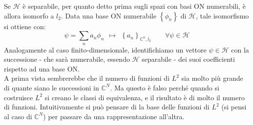 \documentclass[FisicaTeorica.tex]{subfiles}
\begin{document}
Se $\mathcal{H}$ è separabile, per quanto detto prima sugli spazi con basi ON numerabili, è allora isomorfo a $l_2$.  Data una base ON numerabile $\left\{\phi_n\right\}$ di $\mathcal{H}$, tale isomorfismo si ottiene con:
\[
\psi = \sum_{n}{a_n\phi_n} \ \ \mapsto \ \ \left\{a_n\right\}_{\mathbb{C}^n,l_2} \qquad \forall \psi \in \mathcal{H}
\]
Analogamente al caso finito-dimensionale, identifichiamo un vettore $\psi \in \mathcal{H}$ con la successione - che sarà numerabile, essendo $\mathcal{H}$ separabile - dei suoi coefficienti rispetto ad una base ON.\\

A prima vista sembrerebbe che il numero di funzioni di $L^2$ sia molto più grande di quante siano le successioni in ${\mathbb C^N}$. Ma questo è falso perché quando si costruisce $L^2$ si creano le classi di equivalenza, e il risultato è  di molto il numero di funzioni. Intuitivamente si può pensare di  la base delle funzioni di $L^2$ (si pensi al caso di ${\mathbb C}^N$) per passare da una rappresentazione all'altra. \\
\end{document}
